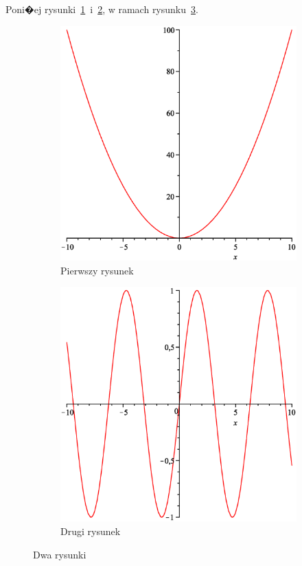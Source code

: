 \documentclass[11pt,wide]{mwart}
\begin{document}
\noindent Poni�ej rysunki~\ref{fig:1}~i~\ref{fig:2}, w ramach rysunku~\ref{fig:fig3}.

\newpage
\begin{figure}[ht]
        \centering
        \begin{subfigure}[ht]{0.44\textwidth}
                \includegraphics[width=\textwidth]{fig1}
                \caption{Pierwszy rysunek}
                \label{fig:1}
        \end{subfigure}%
        \begin{subfigure}[ht]{0.44\textwidth}
                \includegraphics[width=\textwidth]{fig2}
                \caption{Drugi rysunek}
                \label{fig:2}
        \end{subfigure}
        \caption{Dwa rysunki}\label{fig:fig3}
\end{figure}
\end{document}
